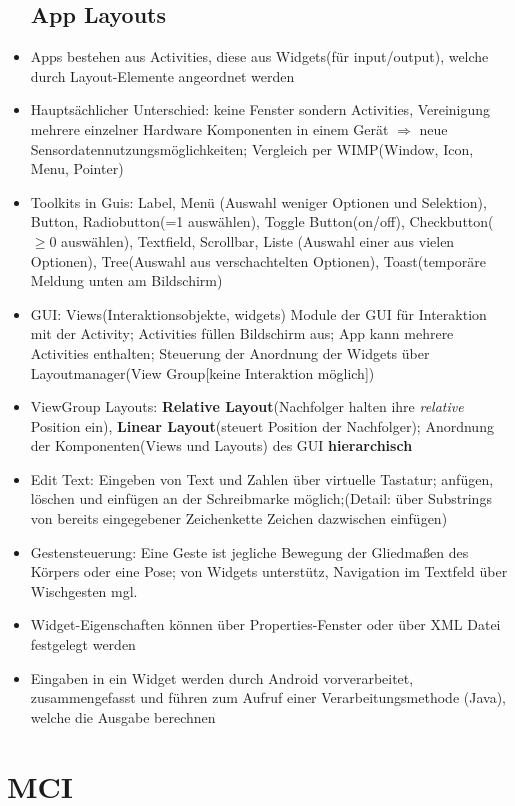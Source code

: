 \documentclass[12pt,landscape]{article}
\begin{document}
\begin{multicols}{3}
\begin{itemize}
\subsection{App Layouts}
\item Apps bestehen aus Activities, diese aus Widgets(für input/output), welche durch Layout-Elemente angeordnet werden
\item Hauptsächlicher Unterschied: keine Fenster sondern Activities, Vereinigung mehrere einzelner Hardware Komponenten in einem Gerät $\Rightarrow$ neue Sensordatennutzungsmöglichkeiten; Vergleich per WIMP(Window, Icon, Menu, Pointer)
\item Toolkits in Guis: Label, Menü (Auswahl weniger Optionen und Selektion), Button, Radiobutton(=1 auswählen), Toggle Button(on/off), Checkbutton($ \geq $0 auswählen), Textfield, Scrollbar, Liste (Auswahl einer aus vielen Optionen), Tree(Auswahl aus verschachtelten Optionen), Toast(temporäre Meldung unten am Bildschirm)
\item GUI: Views(Interaktionsobjekte, widgets) Module der GUI für Interaktion mit der Activity; Activities füllen Bildschirm aus; App kann mehrere Activities enthalten; Steuerung der Anordnung der Widgets über Layoutmanager(View Group[keine Interaktion möglich])
\item ViewGroup Layouts: \textbf{Relative Layout}(Nachfolger halten ihre \textit{relative} Position ein), \textbf{Linear Layout}(steuert Position der Nachfolger); Anordnung der Komponenten(Views und Layouts) des GUI \textbf{hierarchisch}
\item Edit Text: Eingeben von Text und Zahlen über virtuelle Tastatur; anfügen, löschen und einfügen an der Schreibmarke möglich;(Detail: über Substrings von bereits eingegebener Zeichenkette Zeichen dazwischen einfügen)
\item Gestensteuerung: Eine Geste ist jegliche Bewegung der Gliedmaßen des Körpers oder eine Pose; von Widgets unterstütz, Navigation im Textfeld über Wischgesten mgl.
\item Widget-Eigenschaften können über Properties-Fenster oder über XML Datei festgelegt werden
\item Eingaben in ein Widget werden durch Android vorverarbeitet, zusammengefasst und führen zum
Aufruf einer Verarbeitungsmethode (Java), welche die Ausgabe berechnen
\end{itemize}

\section{MCI}

\end{multicols}
\end{document}
